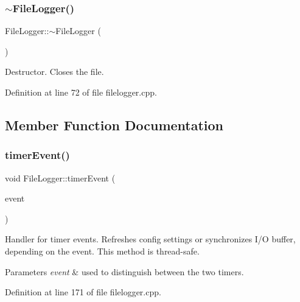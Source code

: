 \subsubsection{\texorpdfstring{$\sim$\+File\+Logger()}{~FileLogger()}}
{\footnotesize\ttfamily File\+Logger\+::$\sim$\+File\+Logger (\begin{DoxyParamCaption}{ }\end{DoxyParamCaption})\hspace{0.3cm}{\ttfamily [virtual]}}

Destructor. Closes the file. 

Definition at line 72 of file filelogger.\+cpp.



\subsection{Member Function Documentation}
\mbox{\label{classstefanfrings_1_1_file_logger_a01eac5311649ce150df7bdf084925d05}} 
\subsubsection{\texorpdfstring{timer\+Event()}{timerEvent()}}
{\footnotesize\ttfamily void File\+Logger\+::timer\+Event (\begin{DoxyParamCaption}\item[{Q\+Timer\+Event $\ast$}]{event }\end{DoxyParamCaption})\hspace{0.3cm}{\ttfamily [protected]}}

Handler for timer events. Refreshes config settings or synchronizes I/O buffer, depending on the event. This method is thread-\/safe. 
\begin{DoxyParams}{Parameters}
{\em event} & used to distinguish between the two timers. \\
\hline
\end{DoxyParams}


Definition at line 171 of file filelogger.\+cpp.

\mbox{\label{classstefanfrings_1_1_file_logger_a9258a5e72c22a6b14e25af8eae2092c1}} 
